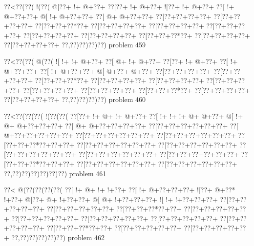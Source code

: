 \vbox{\vbox{\goo
\0??<\0??(\0??(\- !(\0??(
\- @[\0??+\- !+\- @+\0??+
\0??[\0??+\- !+\- @+\0??+
\- ![\0??+\- !+\- @+\0??+
\0??[\- !+\- @+\0??+\0??+
\- @[\- !+\- @+\0??+\0??+
\0??[\- @+\- @+\0??+\0??+
\0??[\0??+\0??+\0??+\0??+
\0??[\0??+\0??+\0??+\0??+
\0??[\0??+\0??+\0??*\0??+
\0??[\0??+\0??+\0??+\0??+
\0??[\0??+\0??+\0??+\0??+
\0??[\0??+\0??+\0??+\0??+
\0??[\0??+\0??+\0??+\0??+
\0??[\0??+\0??+\0??+\0??+
\0??[\0??+\0??+\0??*\0??+
\0??[\0??+\0??+\0??+\0??+
\0??[\0??+\0??+\0??+\0??+
\0??,\0??)\0??)\0??)\0??)
}
\hfil problem 459\hfil\break
}

\vbox{\vbox{\goo
\0??<\0??(\0??(\- @(\0??(
\- ![\- !+\- !+\- @+\0??+
\0??[\- @+\- !+\- @+\0??+
\0??[\0??+\- !+\- @+\0??+
\0??[\- !+\- @+\0??+\0??+
\0??[\- !+\- @+\0??+\0??+
\- @[\- @+\0??+\- @+\0??+
\0??[\0??+\0??+\0??+\0??+
\0??[\0??+\0??+\0??+\0??+
\0??[\0??+\0??+\0??*\0??+
\0??[\0??+\0??+\0??+\0??+
\0??[\0??+\0??+\0??+\0??+
\0??[\0??+\0??+\0??+\0??+
\0??[\0??+\0??+\0??+\0??+
\0??[\0??+\0??+\0??+\0??+
\0??[\0??+\0??+\0??*\0??+
\0??[\0??+\0??+\0??+\0??+
\0??[\0??+\0??+\0??+\0??+
\0??,\0??)\0??)\0??)\0??)
}
\hfil problem 460\hfil\break
}

\vbox{\vbox{\goo
\0??<\0??(\0??(\0??(\- !(\0??(\0??(
\0??[\0??+\- !+\- @+\- !+\- @+\0??+
\0??[\- !+\- !+\- !+\- @+\- @+\0??+
\- @[\- !+\- @+\- @+\0??+\0??+\0??+
\0??[\- @+\- @+\0??+\0??+\0??+\0??+
\0??[\0??+\0??+\0??+\0??+\0??+\0??+
\0??[\- @+\0??+\0??+\0??+\0??+\0??+
\0??[\0??+\0??+\0??+\0??+\0??+\0??+
\0??[\0??+\0??+\0??+\0??+\0??+\0??+
\0??[\0??+\0??+\0??*\0??+\0??+\0??+
\0??[\0??+\0??+\0??+\0??+\0??+\0??+
\0??[\0??+\0??+\0??+\0??+\0??+\0??+
\0??[\0??+\0??+\0??+\0??+\0??+\0??+
\0??[\0??+\0??+\0??+\0??+\0??+\0??+
\0??[\0??+\0??+\0??+\0??+\0??+\0??+
\0??[\0??+\0??+\0??*\0??+\0??+\0??+
\0??[\0??+\0??+\0??+\0??+\0??+\0??+
\0??[\0??+\0??+\0??+\0??+\0??+\0??+
\0??,\0??)\0??)\0??)\0??)\0??)\0??)
}
\hfil problem 461\hfil\break
}

\vbox{\vbox{\goo
\0??<\- @(\0??(\0??(\0??(\0??(
\0??[\- !+\- @+\- !+\- !+\0??+
\0??[\- !+\- @+\0??+\0??+\0??+
\- ![\0??+\- @+\0??*\- !+\0??+
\- @[\0??+\- @+\- !+\0??+\0??+
\- @[\- @+\- !+\0??+\0??+\0??+
\- ![\- !+\- !+\0??+\0??+\0??+
\0??[\0??+\0??+\0??+\0??+\0??+
\0??[\0??+\0??+\0??+\0??+\0??+
\0??[\0??+\0??+\0??*\0??+\0??+
\0??[\0??+\0??+\0??+\0??+\0??+
\0??[\0??+\0??+\0??+\0??+\0??+
\0??[\0??+\0??+\0??+\0??+\0??+
\0??[\0??+\0??+\0??+\0??+\0??+
\0??[\0??+\0??+\0??+\0??+\0??+
\0??[\0??+\0??+\0??*\0??+\0??+
\0??[\0??+\0??+\0??+\0??+\0??+
\0??[\0??+\0??+\0??+\0??+\0??+
\0??,\0??)\0??)\0??)\0??)\0??)
}
\hfil problem 462\hfil\break
}

